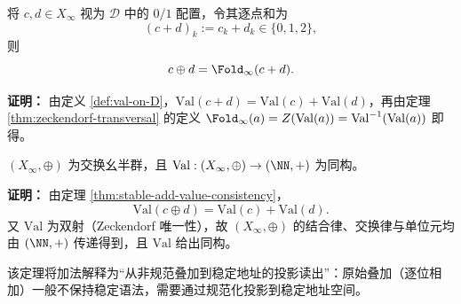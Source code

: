 \begin{corollary}\label{cor:add-as-fold}
将 $c,d\in X_\infty$ 视为 $\mathcal{D}$ 中的 $0/1$ 配置，令其逐点和为
\[
(c+d)_k:=c_k+d_k\in\{0,1,2\},
\]
则
\[
c\oplus d=\Fold_\infty(c+d).
\]
\end{corollary}

\textbf{证明：}
由定义 \ref{def:val-on-D}，$\mathrm{Val}(c+d)=\mathrm{Val}(c)+\mathrm{Val}(d)$，再由定理 \ref{thm:zeckendorf-transversal} 的定义 $\Fold_\infty(a)=Z(\mathrm{Val}(a))=\mathrm{Val}^{-1}(\mathrm{Val}(a))$ 即得。

\begin{theorem}\label{thm:add-definitional}
$(X_\infty,\oplus)$ 为交换幺半群，且 $\mathrm{Val}:(X_\infty,\oplus)\to(\NN,+)$ 为同构。
\end{theorem}

\textbf{证明：}
由定理 \ref{thm:stable-add-value-consistency}，
\[
\mathrm{Val}(c\oplus d)=\mathrm{Val}(c)+\mathrm{Val}(d).
\]
又 \(\mathrm{Val}\) 为双射（Zeckendorf 唯一性），故 \((X_\infty,\oplus)\) 的结合律、交换律与单位元均由 \((\NN,+)\) 传递得到，且 \(\mathrm{Val}\) 给出同构。

该定理将加法解释为“从非规范叠加到稳定地址的投影读出”：原始叠加（逐位相加）一般不保持稳定语法，需要通过规范化投影到稳定地址空间。
